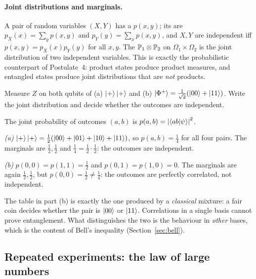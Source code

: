 \paragraph{Joint distributions and marginals.}
A pair of random variables $(X,Y)$ has a  $p(x,y)$; its  are $p_X(x)=\sum_yp(x,y)$ and $p_Y(y)=\sum_xp(x,y)$, and $X,Y$ are independent iff $p(x,y)=p_X(x)p_Y(y)$ for all $x,y$. The  $\mathbb{P}_1\otimes\mathbb{P}_2$ on $\Omega_1\times\Omega_2$ is the joint distribution of two independent variables.
This is exactly the probabilistic counterpart of Postulate~4: product states produce product measures, and entangled states produce joint distributions that are \emph{not} products.

\begin{example}\label{ex:joint-bell}
  Measure $Z$ on both qubits of (a) $\left|+\right\rangle\left|+\right\rangle$ and (b) $\left|\Phi^+\right\rangle=\frac1{\sqrt2}(\left|00\right\rangle+\left|11\right\rangle)$. Write the joint distribution and decide whether the outcomes are independent.
\end{example}
\begin{solution}
  The joint probability of outcomes $(a,b)$ is $p(a,b)=\left|\left\langle ab\middle|\psi\right\rangle\right|^2$.
  \begin{steps}
    \item \emph{(a)} $\left|+\right\rangle\left|+\right\rangle=\tfrac12(\left|00\right\rangle+\left|01\right\rangle+\left|10\right\rangle+\left|11\right\rangle)$, so $p(a,b)=\tfrac14$ for all four pairs. The marginals are $\tfrac12,\tfrac12$ and $\tfrac14=\tfrac12\cdot\tfrac12$: the outcomes are independent.
    \item \emph{(b)} $p(0,0)=p(1,1)=\tfrac12$ and $p(0,1)=p(1,0)=0$. The marginals are again $\tfrac12,\tfrac12$, but $p(0,0)=\tfrac12\ne\tfrac14$: the outcomes are perfectly correlated, not independent.
  \end{steps}
\end{solution}

\begin{pitfall}
  The table in part (b) is exactly the one produced by a \emph{classical} mixture: a fair coin decides whether the pair is $\left|00\right\rangle$ or $\left|11\right\rangle$. Correlations in a single basis cannot prove entanglement. What distinguishes the two is the behaviour in \emph{other} bases, which is the content of Bell's inequality (Section~\ref{sec:bell}).
\end{pitfall}

\subsection{Repeated experiments: the law of large numbers}

